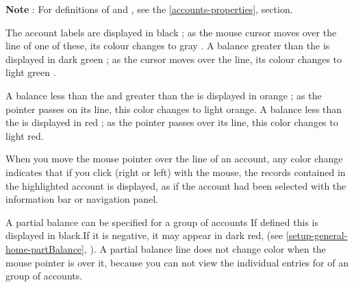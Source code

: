 

\textbf{Note} : For definitions of  and , see the \vref{accounts-properties},  section.


The account labels are displayed in black{\couleur} ; as the mouse cursor moves over the line of one of these, its colour changes to gray {\couleur}.
A balance greater than the    is displayed in dark green {\couleur} ; as the cursor moves over the line, its colour changes to light green {\couleur}.

A balance less than the  and greater than the  is displayed in orange{\couleur} ; as the pointer passes on its line, this color changes to light orange{\couleur}.
A balance less than the    is displayed in red{\couleur} ; as the pointer passes over its line, this color changes to light red{\couleur}.

When you move the mouse pointer over the line of an account, any color change indicates that if you click (right or left) with the mouse, the records contained in the highlighted account is displayed, as if the account had been selected with the information bar or navigation panel.

A partial balance can be specified for a group of accounts  If defined this is displayed in black{\couleur}.If it is negative, it may appear in dark red{\couleur}, (see  \vref{setup-general-home-partBalance}, ). A partial balance line does not change color when the mouse pointer is over it, because you can not view the individual entries for of an group of accounts.

